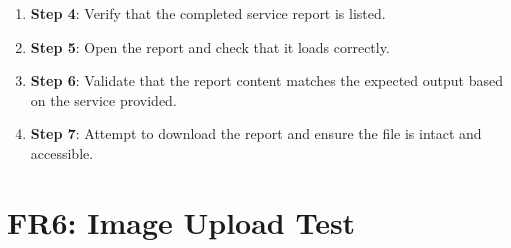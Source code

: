 \documentclass[12pt, titlepage]{article}
\begin{document}
\begin{enumerate}
\begin{itemize}
\begin{enumerate}
            \item \textbf{Step 4}: Verify that the completed service report is listed.
            \item \textbf{Step 5}: Open the report and check that it loads correctly.
            \item \textbf{Step 6}: Validate that the report content matches the expected output based on the service provided.
            \item \textbf{Step 7}: Attempt to download the report and ensure the file is intact and accessible.
        \end{enumerate}
    \end{itemize}
\end{enumerate}

\section*{FR6: Image Upload Test}
\end{document}
